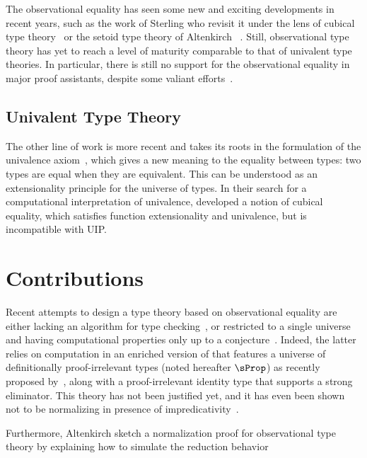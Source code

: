 The observational equality has seen some new and exciting developments in recent 
years, such as the work of Sterling \etal who revisit it under the lens of 
cubical type theory~ or the setoid
type theory of Altenkirch \etal~.
% 
Still, observational type theory has yet to reach a level of maturity 
comparable to that of univalent type theories.
% 
In particular, there is still no support for the observational equality in
major proof assistants, despite some valiant efforts~.

\subsection{Univalent Type Theory}

The other line of work is more recent and takes its roots in the
formulation of the univalence axiom~,
which gives a new meaning to the equality between types: two types are
equal when they are equivalent. 
% 
This can be understood as an extensionality principle for the universe of types.
%
In their search for a computational interpretation of
univalence,  developed a notion of cubical equality,
which satisfies function extensionality and univalence, but is incompatible with UIP.

\section{Contributions}

Recent attempts to design a type theory based on observational equality
are either lacking an algorithm for type checking~, or restricted to a single
universe and having computational properties only up to a
conjecture~. Indeed, the latter relies on computation
in an enriched version of \MLTT that features a universe of definitionally
proof-irrelevant types (noted hereafter $\sProp$) as recently proposed
by~, along with a proof-irrelevant identity type
that supports a strong eliminator. This theory has not been justified yet,
and it has even been shown not to be normalizing in presence of
impredicativity~.

Furthermore, Altenkirch \etal sketch a normalization proof for observational 
type theory by explaining how to simulate the reduction behavior 

